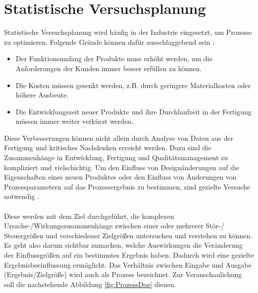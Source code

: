 \documentclass[
fontsize=10pt, 
listof = totoc,
parskip = half	
]{report}
\begin{document}
\section{Statistische Versuchsplanung}
\label{sec:StatVersPlanung}
Statistische Versuchsplanung wird häufig in der Industrie eingesetzt, um Prozesse zu optimieren. Folgende Gründe können dafür ausschlaggebend sein \cite{kleppmann_2020}:

\begin{itemize}
	\item Der Funktionsumfang der Produkte muss erhöht werden, um die Anforderungen der Kunden immer besser erfüllen zu können.
	\item Die Kosten müssen gesenkt werden, z.B. durch geringere Materialkosten oder höhere
	Ausbeute.
	\item Die Entwicklungszeit neuer Produkte und ihre Durchlaufzeit in der Fertigung müssen
	immer weiter verkürzt werden.
\end{itemize}

\noindent Diese Verbesserungen können nicht allein durch Analyse von Daten aus der Fertigung und kritisches Nachdenken erreicht werden. Dazu sind die Zusammenhänge in Entwicklung, Fertigung und Qualitätsmanagement zu kompliziert und vielschichtig. Um den Einfluss von Designänderungen auf die Eigenschaften eines neuen Produktes oder den Einfluss von Änderungen von Prozessparametern auf das Prozessergebnis zu bestimmen,
sind gezielte Versuche notwendig \cite{kleppmann_2020}.
\\\\
\noindent Diese werden mit dem Ziel durchgeführt, die komplexen Ursache-/Wirkungszusammenhänge zwischen einer oder mehrerer Stör-/ Steuergrößen und verschiedener Zielgrößen untersuchen und verstehen zu können. Es geht also darum sichtbar zumachen, welche Auswirkungen die Veränderung der Einflussgrößen auf ein bestimmtes Ergebnis haben. Dadurch wird eine gezielte Ergebnisbeeinflussung ermöglicht. Das Verhältnis zwischen Eingabe und Ausgabe (Ergebnis/Zielgröße) wird auch als Prozess bezeichnet. Zur Veranschaulichung soll die nachstehende Abbildung \ref{fig:ProzessDoe} dienen.
\end{document}
